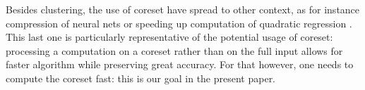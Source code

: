 Besides clustering, the use of coreset have spread to other context, as for instance compression of neural nets \cite{BaykalLGFR19} or speeding up computation of quadratic regression \cite{MaaloufJF19}.
This last one is particularly representative of the potential usage of coreset: processing a computation on a coreset rather than on the full input allows for faster algorithm while preserving great accuracy.
For that however, one needs to compute the coreset fast: this is our goal in the present paper.